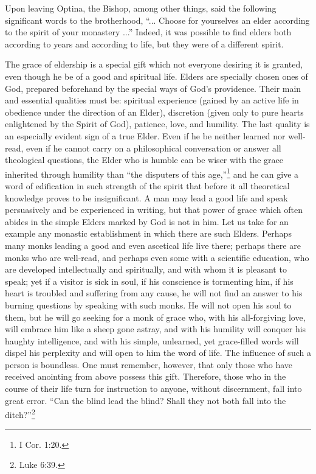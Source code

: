 Upon leaving Optina, the Bishop, among other things, said the following significant words to the brotherhood, ``... Choose for yourselves an elder according to the spirit of your monastery ...'' Indeed, it was possible to find elders both according to years and according to life, but they were of a different spirit.

The grace of eldership is a special gift which not everyone desiring it is granted, even though he be of a good and spiritual life. Elders are specially chosen ones of God, prepared beforehand by the special ways of God's providence. Their main and essential qualities must be: spiritual experience (gained by an active life in obedience under the direction of an Elder), discretion (given only to pure hearts enlightened by the Spirit of God), patience, love, and humility. The last quality is an especially evident sign of a true Elder. Even if he be neither learned nor well-read, even if he cannot carry on a philosophical conversation or answer all theological questions, the Elder who is humble can be wiser with the grace inherited through humility than ``the disputers of this age,''\footnote{I Cor. 1:20.} and he can give a word of edification in such strength of the spirit that before it all theoretical knowledge proves to be insignificant. A man may lead a good life and speak persuasively and be experienced in writing, but that power of grace which often abides in the simple Elders marked by God is not in him. Let us take for an example any monastic establishment in which there are such Elders. Perhaps many monks leading a good and even ascetical life live there; perhaps there are monks who are well-read, and perhaps even some with a scientific education, who are developed intellectually and spiritually, and with whom it is pleasant to speak; yet if a visitor is sick in soul, if his conscience is tormenting him, if his heart is troubled and suffering from any cause, he will not find an answer to his burning questions by speaking with such monks. He will not open his soul to them, but he will go seeking for a monk of grace who, with his all-forgiving love, will embrace him like a sheep gone astray, and with his humility will conquer his haughty intelligence, and with his simple, unlearned, yet grace-filled words will dispel his perplexity and will open to him the word of life. The influence of such a person is boundless. One must remember, however, that only those who have received anointing from above possess this gift. Therefore, those who in the course of their life turn for instruction to anyone, without discernment, fall into great error. ``Can the blind lead the blind? Shall they not both fall into the ditch?''\footnote{Luke 6:39.}

